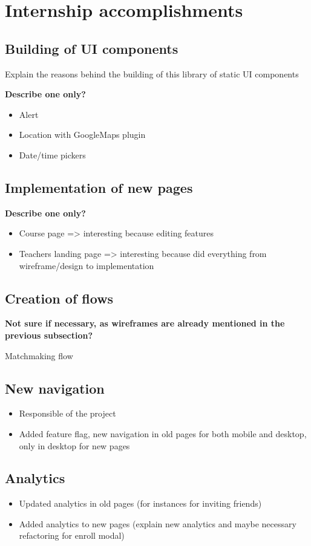 \section{Internship accomplishments}
\label{sec:accomplish}

\subsection{Building of UI components}
\label{ssec:ui_components}

Explain the reasons behind the building of this library of static UI components

\textbf{Describe one only?}

\begin{itemize}
    \item Alert
    \item Location with GoogleMaps plugin
    \item Date/time pickers
\end{itemize}

\subsection{Implementation of new pages}
\label{ssec:new_pages}

\textbf{Describe one only?}

\begin{itemize}
    \item Course page => interesting because editing features
    \item Teachers landing page => interesting because did everything from wireframe/design to implementation
\end{itemize}

\subsection{Creation of flows}
\label{ssec:flows}

\textbf{Not sure if necessary, as wireframes are already mentioned in the previous subsection?}

Matchmaking flow

\subsection{New navigation}
\label{ssec:new_nav}

\begin{itemize}
    \item Responsible of the project
    \item Added feature flag, new navigation in old pages for both mobile and desktop, only in desktop for new pages
\end{itemize}

\subsection{Analytics}
\label{ssec:analytics}

\begin{itemize}
    \item Updated analytics in old pages (for instances for inviting friends)
    \item Added analytics to new pages (explain new analytics and maybe necessary refactoring for enroll modal)
\end{itemize}
